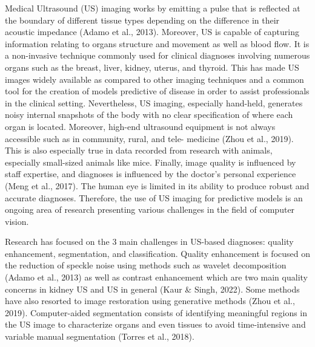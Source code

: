 \documentclass[
]{article}
\begin{document}
Medical Ultrasound (US) imaging works by emitting a pulse that is
reflected at the boundary of different tissue types depending on the
difference in their acoustic impedance (Adamo et al., 2013). Moreover,
US is capable of capturing information relating to organs structure and
movement as well as blood flow. It is a non-invasive technique commonly
used for clinical diagnoses involving numerous organs such as the
breast, liver, kidney, uterus, and thyroid. This has made US images
widely available as compared to other imaging techniques and a common
tool for the creation of models predictive of disease in order to assist
professionals in the clinical setting. Nevertheless, US imaging,
especially hand-held, generates noisy internal snapshots of the body
with no clear specification of where each organ is located. Moreover,
high-end ultrasound equipment is not always accessible such as in
community, rural, and tele- medicine (Zhou et al., 2019). This is also
especially true in data recorded from research with animals, especially
small-sized animals like mice. Finally, image quality is influenced by
staff expertise, and diagnoses is influenced by the doctor's personal
experience (Meng et al., 2017). The human eye is limited in its ability
to produce robust and accurate diagnoses. Therefore, the use of US
imaging for predictive models is an ongoing area of research presenting
various challenges in the field of computer vision.

Research has focused on the 3 main challenges in US-based diagnoses:
quality enhancement, segmentation, and classification. Quality
enhancement is focused on the reduction of speckle noise using methods
such as wavelet decomposition (Adamo et al., 2013) as well as contrast
enhancement which are two main quality concerns in kidney US and US in
general (Kaur \& Singh, 2022). Some methods have also resorted to image
restoration using generative methods (Zhou et al., 2019). Computer-aided
segmentation consists of identifying meaningful regions in the US image
to characterize organs and even tissues to avoid time-intensive and
variable manual segmentation (Torres et al., 2018).
\end{document}
